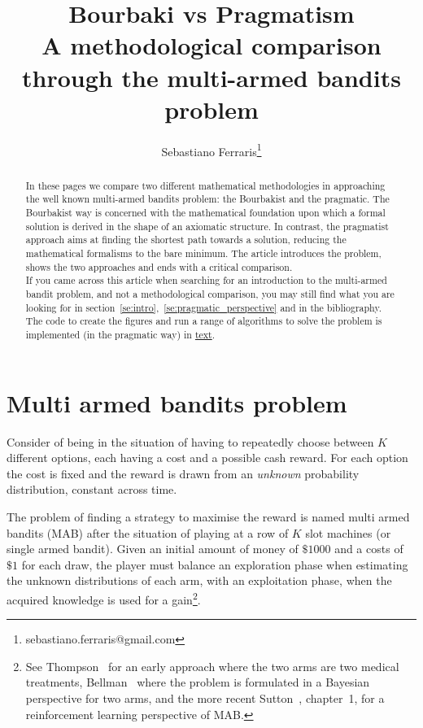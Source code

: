 \documentclass[]{scrartcl}
\title{Bourbaki vs Pragmatism \\ A methodological comparison through the multi-armed bandits problem}
\author{Sebastiano Ferraris\footnote{sebastiano.ferraris@gmail.com}}
\begin{document}
\maketitle

\begin{abstract}
In these pages we compare two different mathematical methodologies in approaching the well known multi-armed bandits problem: the Bourbakist and the pragmatic. The Bourbakist way is concerned with the mathematical foundation upon which a formal solution is derived in the shape of an axiomatic structure. In contrast, the pragmatist approach aims at finding the shortest path towards a solution, reducing the mathematical formalisms to the bare minimum.
The article introduces the problem, shows the two approaches and ends with a critical comparison. \\

\noindent
If you came across this article when searching for an introduction to the multi-armed bandit problem, and not a methodological comparison, you may still find what you are looking for in section~\ref{se:intro},~\ref{se:pragmatic_perspective} and in the bibliography. The code to create the figures and run a range of algorithms to solve the problem is implemented (in the pragmatic way) in \href{url}{text}. 
\end{abstract}


\section{Multi armed bandits problem}
\label{se:intro}
Consider of being in the situation of having to repeatedly choose between $K$ different options, each having a cost and a possible cash reward. For each option the cost is fixed and the reward is drawn from an \emph{unknown} probability distribution, constant across time.

The problem of finding a strategy to maximise the reward is named multi armed bandits (MAB) after the situation of playing at a row of $K$ slot machines (or single armed bandit). Given an initial amount of money of $\$1000$ and a costs of $\$1$ for each draw, the player must balance an exploration phase when estimating the unknown distributions of each arm, with an exploitation phase, when the acquired knowledge is used for a gain\footnote{See Thompson~\cite{thompson1933likelihood} for an early approach where the two arms are two medical treatments, Bellman~\cite{bellman1956problem} where the problem is formulated in a Bayesian perspective for two arms, and the more recent Sutton~\cite{sutton2018reinforcement}, chapter~1, for a reinforcement learning perspective of MAB.}.
\end{document}
